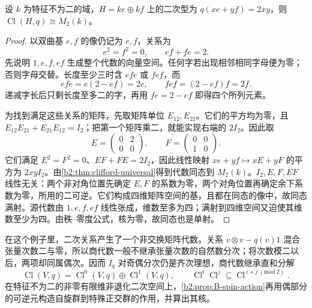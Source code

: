 \begin{example}\label{b2:exm:clifford-hyperbolic-plane}
	设 \(k\) 为特征不为二的域，\(H=ke\oplus kf\) 上的二次型为 \(q(xe+yf)=2xy\)，则 \(\operatorname{Cl}(H,q)\cong M_2(k)\)。
\end{example}
\begin{proof}
	以双曲基 \(e,f\) 的像仍记为 \(e,f\)，关系为
	\[
		e^2=f^2=0,\qquad ef+fe=2.
	\]
	先说明 \(1,e,f,ef\) 生成整个代数的向量空间。任何字若出现相邻相同字母便为零；否则字母交替。长度至少三时含 \(efe\) 或 \(fef\)，而
	\[
		efe=e(2-ef)=2e,\qquad fef=(2-ef)f=2f.
	\]
	递减字长后只剩长度至多二的字，再用 \(fe=2-ef\) 即得四个所列元素。

	为找到满足这些关系的矩阵，先取矩阵单位 \(E_{12},E_{21}\)。它们的平方均为零，且 \(E_{12}E_{21}+E_{21}E_{12}=I_2\)；把第一个矩阵乘二，就能实现右端的 \(2I_2\)。因此取
	\[
		E=\begin{pmatrix}0&2\\0&0\end{pmatrix},\qquad
		F=\begin{pmatrix}0&0\\1&0\end{pmatrix}.
	\]
	它们满足 \(E^2=F^2=0\)、\(EF+FE=2I_2\)，因此线性映射 \(xe+yf\mapsto xE+yF\) 的平方为 \(2xyI_2\)。由\cref{b2:thm:clifford-universal}得到代数同态到 \(M_2(k)\)。\(I_2,E,F,EF\) 线性无关：两个非对角位置先确定 \(E,F\) 的系数为零，两个对角位置再确定余下系数为零，所用的二可逆。它们构成四维矩阵空间的基，且都在同态的像中，故同态满射。源代数由 \(1,e,f,ef\) 线性张成，维数至多为四；满射到四维空间又迫使其维数至少为四。由秩--零度公式，核为零，故同态也是单射。
\end{proof}

在这个例子里，二次关系产生了一个非交换矩阵代数。关系 \(v\otimes v-q(v)1\) 混合张量次数二与零，所以商代数一般不继承张量次数的自然数分次；将次数模二以后，两项却同属偶次。因而 \(I_q\) 对奇偶分次仍是齐次理想，商代数继承直和分解
\[
	\operatorname{Cl}(V,q)=\operatorname{Cl}^0(V,q)\oplus \operatorname{Cl}^1(V,q), \qquad \operatorname{Cl}^i\operatorname{Cl}^j\subseteq \operatorname{Cl}^{\,i+j\ (\mathrm{mod}\ 2)}.
\]
在特征不为二的非零有限维非退化二次空间上，\cref{b2:prop:B-spin-action}再用偶部分的可逆元构造自旋群到特殊正交群的作用，并算出其核。

